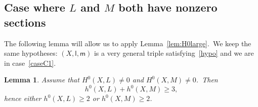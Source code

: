 \documentclass[12pt]{amsart}
\newtheorem{lemm}{Lemma}[section]
\theoremstyle{remark}
\def\lll{\ensuremath{\mathsf l}}
\def\mm{\ensuremath{\mathsf m}}
\begin{document}
\subsection{Case where $L$ and $M$ both have nonzero sections}\label{nonz}

The following lemma will allow  us to apply Lemma~\ref{lem:H0large}.\ We keep the same hypotheses: $(X,\lll,\mm)$ is a very   general triple satisfying~\eqref{hypo} and we are in case~\ref{caseC1}.

\begin{lemm}\label{lecasholhoM}
Assume that $H^0(X,L)\ne 0$ and $H^0(X,M)\ne 0$.\
Then
\begin{equation*}
h^0(X,L)+h^0(X,M)\geq 3,
\end{equation*}
hence either $h^0(X,L)\geq 2$ or $h^0(X,M)\geq2$.
\end{lemm}
\end{document}
